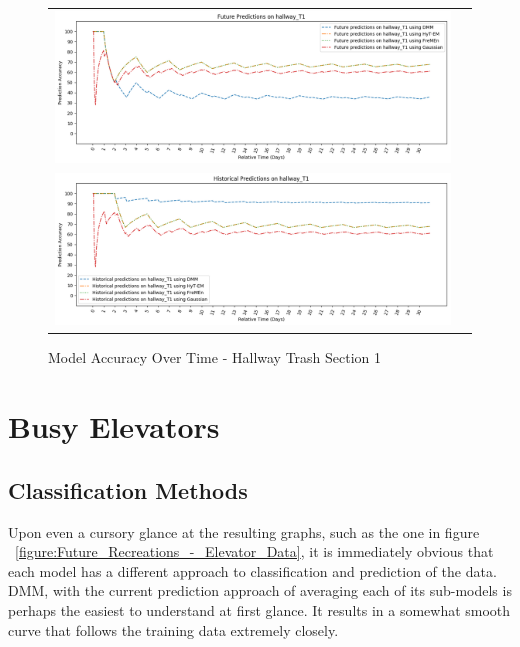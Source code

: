 \begin{center}
\begin{figure}[!Hp]
  \begin{tabular}{cc}
    {\includegraphics[width = 6in]{images/results/Future_Predictions_on_hallway_T1.png}} \\
    {\includegraphics[width = 6in]{images/results/Historical_Predictions_on_hallway_T1.png}} \\
  \end{tabular}
  \caption{Model Accuracy Over Time - Hallway Trash Section 1}
\end{figure}
\end{center}




\section{ Busy Elevators }

\subsection{ Classification Methods }

Upon even a cursory glance at the resulting graphs, such as the one in figure
~\ref{figure:Future_Recreations_-_Elevator_Data}, it is immediately
obvious that each model has a different approach to classification and
prediction of the data. DMM, with the current prediction approach of
averaging each of its sub-models is perhaps the easiest to understand at first
glance. It results in a somewhat smooth curve that follows the training data
extremely closely. \\

